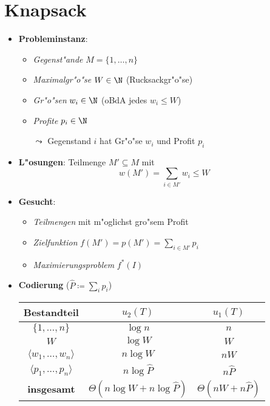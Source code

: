 \section{Knapsack}

\begin{itemize}
  \item \textbf{Probleminstanz}:
  \begin{itemize}
    \item \emph{Gegenst"ande} $ M = \{ 1,\dots,n \} $ 
    \item \emph{Maximalgr"o"se} $ W \in \N $ (Rucksackgr"o"se)
    \item \emph{Gr"o"sen} $ w_i \in \N $ (oBdA jedes $ w_i \leq W $)
    \item \emph{Profite} $ p_i \in \N $
    \item[$ \leadsto $] Gegenstand $ i $ hat Gr"o"se $ w_i $ und Profit $ p_i $
  \end{itemize}
  \item \textbf{L"osungen}: Teilmenge $ M' \subseteq M $ mit
    \begin{equation*}
      w(M') = \textstyle\sum_{i \in M'}w_i \leq W
    \end{equation*}
  \item \textbf{Gesucht}:
  \begin{itemize}
    \item \emph{Teilmengen} mit m"oglichst gro"sem Profit
    \item \emph{Zielfunktion} $ f(M') = p(M') = \sum_{i \in M'}p_i $
    \item \emph{Maximierungsproblem} $ f^*(I) $
  \end{itemize}
  \item \textbf{Codierung} ($ \hat{P} \coloneqq \sum_i p_i $)
  \begin{center}
    \begin{tabular}{ c c c } 
      \hline    
      Bestandteil & $ u_2(T) $ & $ u_1(T) $ \\
      \hline
      $ \{ 1,\dots,n \} $ & $ \log n $ & $ n $ \\
      $ W $ & $ \log W $ & $ W $ \\
      $ \langle w_1, \dots, w_n \rangle $ & $ n\log W $ & $ nW $ \\
      $ \langle p_1, \dots, p_n \rangle $ & $ n\log \hat{P} $ & $ n \hat{P} $ \\
      \hline
      \textbf{insgesamt} & $ \Theta(n\log W + n\log \hat{P}) $ & $ \Theta(nW + n\hat{P}) $
    \end{tabular}

\end{center}
\end{itemize}
